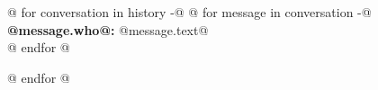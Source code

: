 \documentclass[a4paper]{article}
\begin{document}
@{ for conversation in history -}@
@{ for message in conversation -}@
\textbf{@{{message.who}}@:} @{{message.text}}@ \\
@{ endfor }@

@{ endfor }@
\end{document}
